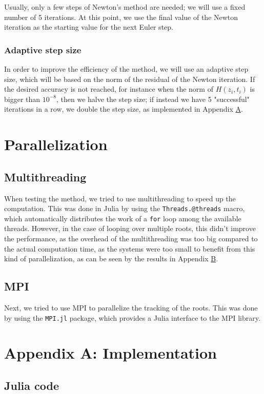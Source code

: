 \documentclass[a4paper]{article}
\theoremstyle{definition}
\theoremstyle{definition}
\theoremstyle{remark}
\theoremstyle{definition}
\begin{document}
Usually, only a few steps of Newton's method are needed; we will use a fixed number of 5 iterations.
At this point, we use the final value of the Newton iteration as the starting value for the next Euler step.
\subsubsection{Adaptive step size}
In order to improve the efficiency of the method, we will use an adaptive step size, which will be based on the norm of the residual of the Newton iteration.
If the desired accuracy is not reached, for instance when the norm of $H(z_i,t_i)$ is bigger than $10^{-8}$,
then we halve the step size; if instead we have 5 "successful" iterations in a row, we double the step size, as implemented in Appendix \hyperref[code:adapt]{A}.

\section{Parallelization}
\subsection{Multithreading}
When testing the method, we tried to use multithreading to speed up the computation.
This was done in Julia by using the \texttt{Threads.@threads} macro, which automatically distributes the work of a \texttt{for} loop among the available threads.
However, in the case of looping over multiple roots, this didn't improve the performance, as the overhead of the multithreading was too big compared to the actual computation time,
as the systems were too small to benefit from this kind of parallelization, as can be seen by the results in Appendix \hyperref[sec:mt]{B}.

\subsection{MPI}
Next, we tried to use MPI to parallelize the tracking of the roots.
This was done by using the \texttt{MPI.jl} \cite{JuliaMPI} package, which provides a Julia interface to the MPI library.

\section{Appendix A: Implementation}
\subsection{Julia code}
\label{code:adapt}
\end{document}
